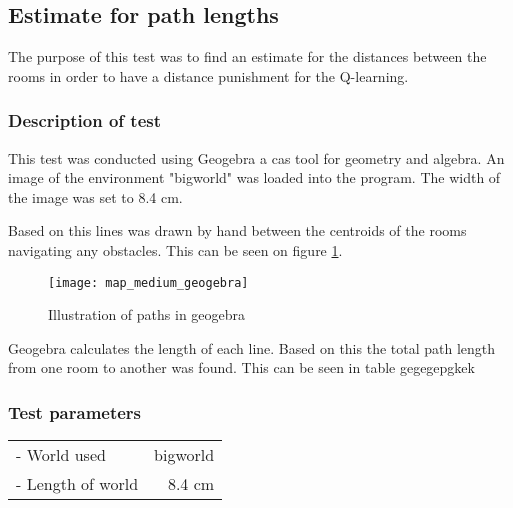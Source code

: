 \documentclass[../Head/Main.tex]{subfiles}
\begin{document}
\subsection{Estimate for path lengths}
\label{subsec:est_path_length}
The purpose of this test was to find an estimate for the distances between the rooms in order to have a distance punishment for the Q-learning.
\subsubsection{Description of test}
This test was conducted using Geogebra a cas tool for geometry and algebra. An image of the environment "bigworld" was loaded into the program. The width of the image was set to 8.4 cm.\par 
Based on this lines was drawn by hand between the centroids of the rooms navigating any obstacles. This can be seen on figure \ref{fig:geogebra}.
\begin{figure}[H]
	\centering
	\texttt{[image: map\_medium\_geogebra]}
	\caption{Illustration of paths in geogebra}
	\label{fig:geogebra}
\end{figure}
Geogebra calculates the length of each line. Based on this the total path length from one room to another was found. This can be seen in table gegegepgkek
\subsubsection{Test parameters}
\begin{tabular}{l r}
	- World used                & bigworld\\	
	- Length of world           & 8.4 cm\\
\end{tabular}
\end{document}
